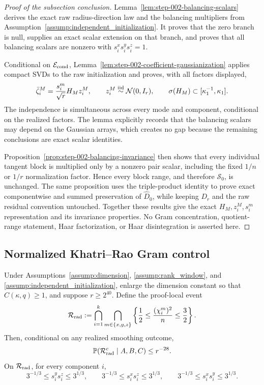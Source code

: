 \begin{proof}[Proof of the subsection conclusion]

Lemma~\ref{lem:step-002-balancing-scalars} derives the exact raw
radius-direction law and the balancing multipliers from
Assumption~\ref{assump:independent_initialization}. It proves that the zero
branch is null, supplies an exact scalar extension on that branch, and proves
that all balancing scalars are nonzero with
\(s_i^xs_i^ys_i^z=1\).

Conditional on \(\mathcal E_{\rm cond}\),
Lemma~\ref{lem:step-002-coefficient-gaussianization} applies compact SVDs to
the raw initialization and proves, with all factors displayed,
\[
  \bar\zeta_i^M=\frac{s_i^m}{\sqrt r}H_Mz_i^M,
  \qquad z_i^M\stackrel{\rm iid}{\sim}\mathcal N(0,I_r),
  \qquad \sigma(H_M)\subset[\kappa_1^{-1},\kappa_1].
\]
The independence is simultaneous across every mode and component, conditional
on the realized factors. The lemma explicitly records that the balancing
scalars may depend on the Gaussian arrays, which creates no gap because the
remaining conclusions are exact scalar identities.

Proposition~\ref{prop:step-002-balancing-invariance} then shows that every
individual tangent block is multiplied only by a nonzero pair scalar, including
the fixed \(1/n\) or \(1/r\) normalization factor. Hence every block range,
and therefore \(\mathscr S_0\), is unchanged. The same proposition uses the
triple-product identity to prove exact componentwise and summed preservation
of \(\widehat D_0\), while keeping \(D_r\) and the raw residual convention
untouched. Together these results give the exact
\(H_M,z_i^M,s_i^m\) representation and its invariance properties.
No Gram concentration, quotient-range statement, Haar factorization, or Haar
disintegration is asserted here.

\end{proof}

\subsection{Normalized Khatri--Rao Gram control}\label{app:step-003}

\begin{lemma}
\label{lem:step-003-radius-diagonals}
Under Assumptions~\ref{assump:dimension}, \ref{assump:rank_window}, and
\ref{assump:independent_initialization}, enlarge the dimension constant so
that \(C(\kappa,q)\ge1\), and suppose \(r\ge2^{40}\). Define the proof-local
event
\[
  \mathcal R_{\rm rad}
  :=\bigcap_{i=1}^k\bigcap_{m\in\{x,y,z\}}
    \left\{\frac12\le\frac{(\chi_i^m)^2}{n}\le\frac32\right\}.
\]
Then, conditional on any realized smoothing outcome,
\[
  \mathbb P(\mathcal R_{\rm rad}^c\mid A,B,C)\le r^{-28}.
\]
On \(\mathcal R_{\rm rad}\), for every component \(i\),
\[
  3^{-1/3}\le s_i^ys_i^z\le3^{1/3},\qquad
  3^{-1/3}\le s_i^xs_i^z\le3^{1/3},\qquad
  3^{-1/3}\le s_i^xs_i^y\le3^{1/3}.
\]

\end{lemma}

